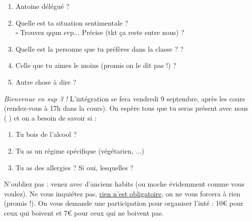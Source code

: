 \documentclass[french,bookmarks]{article}
\begin{document}
\begin{enumerate}
        \item Antoine délégué ?  \hfill {} \hfill \makebox[2cm][l]{\color{black!10!white}{$\square$ non}}
        
        \item Quelle est ta situation sentimentale ?  \hfill {} \hfill
         \hfill\text{}\\
         $\square$ Trouvez qqun svp... Précise (tkt ça reste entre nous) ? \enspace\hrulefill\\
        \text{}\enspace\hrulefill
        
        \item Quelle est la personne que tu préfères dans la classe ? \enspace\hrulefill ?
        
        \item Celle que tu aimes le moins (promis on le dit pas !) ? \enspace\hrulefill
        
        \item Autre chose à dire ? \enspace\hrulefill
        
    \end{enumerate}
    
    \text{}\newline
    
    \noindent\textit{\large\EBGaramond Bienvenue en sup 3 !} L'intégration se fera vendredi 9 septembre, après les cours (rendez-vous à 17h dans la cours). On espère tous que tu seras présent avec nous ( ) et on a besoin de savoir si :
    
    \begin{enumerate}
        \item[\ast] Tu bois de l'alcool ?    
        
        \item[\ast] Tu as un régime spécifique (végétarien, ...) \enspace\hrulefill
        
        \item[\ast] Tu as des allergies ? Si oui, lesquelles ? \enspace\hrulefill
    \end{enumerate}
    
    \noindent N'oubliez pas : venez avec d’anciens habits (ou moche évidemment comme vous voulez). Ne vous inquiétez pas, \underline{rien n'est obligatoire}, on ne vous forcera à rien (promis !). On vous demande une participation pour organiser l’inté : 10€ pour ceux qui boivent et 7€ pour ceux qui ne boivent pas.
    
\end{document}
